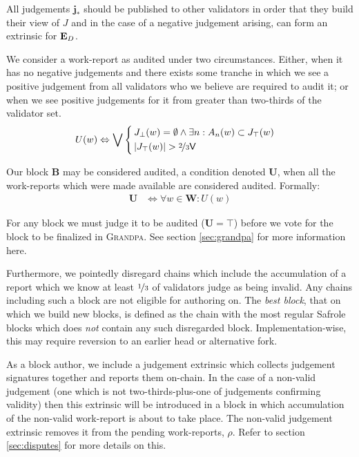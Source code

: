 All judgements $\mathbf{j}_*$ should be published to other validators in order that they build their view of $J$ and in the case of a negative judgement arising, can form an extrinsic for $\mathbf{E}_D$.

We consider a work-report as audited under two circumstances. Either, when it has no negative judgements and there exists some tranche in which we see a positive judgement from all validators who we believe are required to audit it; or when we see positive judgements for it from greater than two-thirds of the validator set.
\begin{align}
  U(w) &\Leftrightarrow \bigvee\,\left\{\,\begin{aligned}
      &J_\bot(w) = \emptyset \wedge \exists n : A_n(w) \subset J_\top(w) \\
      &|J_\top(w)| > \nicefrac{2}{3}\mathsf{V}
  \end{aligned}\right.
\end{align}

Our block $\mathbf{B}$ may be considered audited, a condition denoted $\mathbf{U}$, when all the work-reports which were made available are considered audited. Formally:
\begin{align}
  \mathbf{U} &\Leftrightarrow \forall w \in \mathbf{W} : U(w)
\end{align}

For any block we must judge it to be audited (\ie $\mathbf{U} = \top$) before we vote for the block to be finalized in \textsc{Grandpa}. See section \ref{sec:grandpa} for more information here.

Furthermore, we pointedly disregard chains which include the accumulation of a report which we know at least $\nicefrac{1}{3}$ of validators judge as being invalid. Any chains including such a block are not eligible for authoring on. The \emph{best block}, \ie that on which we build new blocks, is defined as the chain with the most regular Safrole blocks which does \emph{not} contain any such disregarded block. Implementation-wise, this may require reversion to an earlier head or alternative fork.

As a block author, we include a judgement extrinsic which collects judgement signatures together and reports them on-chain. In the case of a non-valid judgement (\ie one which is not two-thirds-plus-one of judgements confirming validity) then this extrinsic will be introduced in a block in which accumulation of the non-valid work-report is about to take place. The non-valid judgement extrinsic removes it from the pending work-reports, $\rho$. Refer to section \ref{sec:disputes} for more details on this.

